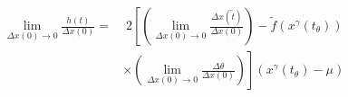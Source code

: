 \documentclass[11pt, letterpaper]{article}
\begin{document}
\pagestyle{empty}
\begin{equation}
  \begin{aligned}
  \lim_{\Delta x(0) \to 0} \frac{h(t)}{\Delta x(0)} =& \; 2\left[\left(\lim_{\Delta x(0) \to 0}\frac{\Delta x(\tilde{t})}{\Delta x(0)}\right) - \tilde{f}\left(x^\gamma(t_\theta)\right)\right.\\
    &\times \left.\left( \lim_{\Delta x(0) \to 0}\frac{\Delta\theta}{\Delta x(0)}\right)\right] \left(x^\gamma(t_\theta) - \mu\right)\\
  \end{aligned}
  \tag{28}
\end{equation}
\end{document}
